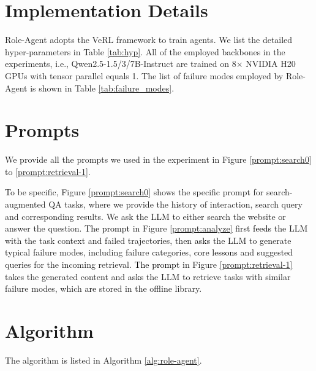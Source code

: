 \documentclass[11pt]{article}
\begin{document}
\section{Implementation Details}\label{appx:c}
Role-Agent adopts the VeRL framework to train agents. We list the detailed hyper-parameters in Table \ref{tab:hyp}. All of the employed backbones in the experiments, i.e., Qwen2.5-1.5/3/7B-Instruct are trained on 8$\times$ NVIDIA H20 GPUs with tensor parallel equals 1. The list of failure modes employed by Role-Agent is shown in Table \ref{tab:failure_modes}.



\section{Prompts}
\label{appx:d}
We provide all the prompts we used in the experiment in Figure \ref{prompt:search0} to \ref{prompt:retrieval-1}. 

To be specific, Figure \ref{prompt:search0} shows the specific prompt for search-augmented QA tasks, where we provide the history of interaction, search query and corresponding results. We ask the LLM to either search the website or answer the question. \textcolor{black}{The prompt} in Figure \ref{prompt:analyze} first \textcolor{black}{feeds} the LLM with the task context and failed trajectories, then \textcolor{black}{asks} the LLM to generate typical failure modes, including failure categories, \textcolor{black}{core lessons} and suggested queries for the incoming retrieval. \textcolor{black}{The prompt} in Figure \ref{prompt:retrieval-1} takes the generated content and \textcolor{black}{asks} the LLM to retrieve tasks with similar failure modes, which \textcolor{black}{are} stored in the offline library.

\section{Algorithm}
The algorithm is listed in Algorithm \ref{alg:role-agent}.
\end{document}
